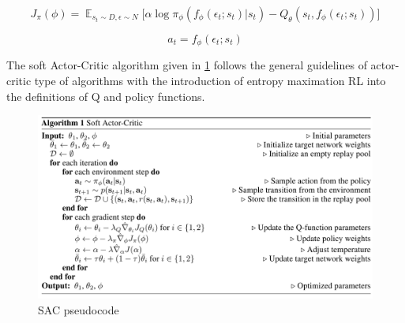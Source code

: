 \begin{equation}
    J_{\pi}(\phi) = \mathop{\mathbb{E}}_{s_t \sim D, \epsilon \sim N} \Big[\alpha \log\pi_{\phi}(f_{\phi}(\epsilon_t;s_t)|s_t) - Q_{\theta}(s_t, f_{\phi}(\epsilon_t;s_t))\Big]
    \label{eq:losspolicy}
\end{equation}

\begin{equation}
    a_t = f_{\phi}(\epsilon_t; s_t)
    \label{eq:reparameterization}
\end{equation} 

The soft Actor-Critic algorithm given in \ref{fig:sacalgo} follows the general guidelines of actor-critic type of algorithms with the introduction of entropy maximation RL into the definitions of Q and policy functions.

\begin{figure}[htbp] 
    \centering
    \includegraphics[width=1.0\textwidth]{figures/SACalgo}
    \caption{SAC pseudocode \cite{Haarnoja2018}}
    \label{fig:sacalgo}
\end{figure}
